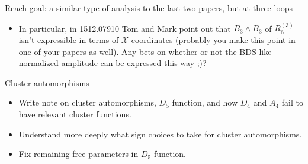 \documentclass[12pt]{article}
\begin{document}
Reach goal: a similar type of analysis to the last two papers, but at three loops
\begin{itemize}
	\item In particular, in 1512.07910 Tom and Mark point out that $B_3\wedge B_3$ of $R^{(3)}_6$ isn't expressible in terms of $\mathcal{X}$-coordinates (probably you make this point in one of your papers as well). Any bets on whether or not the BDS-like normalized amplitude can be expressed this way ;)?\\
\end{itemize}


Cluster automorphisms
\begin{itemize}
	\item Write note on cluster automorphisms, $D_5$ function, and how $D_4$ and $A_4$ fail to have relevant cluster functions.

	\item Understand more deeply what sign choices to take for cluster automorphisms.

	\item Fix remaining free parameters in $D_5$ function.\\
\end{itemize}
\end{document}
